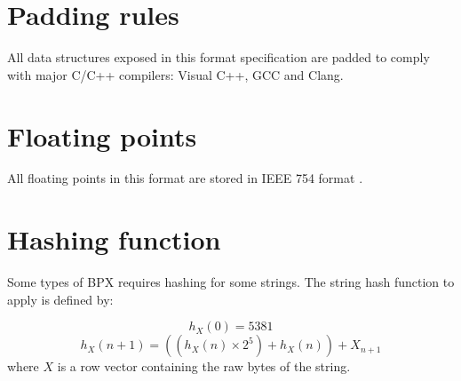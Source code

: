 \section{Padding rules}
All data structures exposed in this format specification are padded to comply with major C/C++ compilers: Visual C++, GCC and Clang.

\section{Floating points}
All floating points in this format are stored in IEEE 754 format \cite{ieee754}.

\section{Hashing function}
Some types of BPX requires hashing for some strings. The string hash function to apply is defined by:

\begin{equation}
	h_X(0) = 5381
\end{equation}
\begin{equation}
	h_X(n + 1) = \left( \left( h_X(n) \times 2^5 \right) + h_X(n) \right) + X_{n + 1}
\end{equation}
where $X$ is a row vector containing the raw bytes of the string.